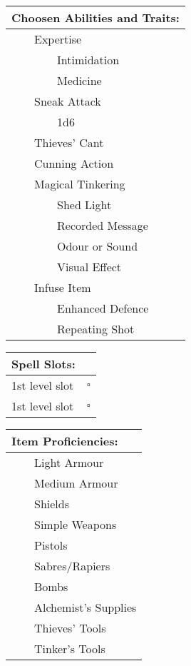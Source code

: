 \documentclass[11pt]{article}
\newcommand{\available}{$\square$}
\newcommand{\tabitem}{~~\llap{--}~~}
\newcommand{\tabtabitem}{~~~~~~\llap{$\bullet$}~~}
\begin{document}
\begin{multicols}{2}
\vspace{4mm}

\noindent \begin{tabularx}{95mm}{@{}l}
{\Large \textbf{Choosen Abilities and Traits:}} \\
\hline
\tabitem Expertise \\
\tabtabitem Intimidation \\
\tabtabitem Medicine \\
\tabitem Sneak Attack \\
\tabtabitem 1d6 \\
\tabitem Thieves' Cant \\
\tabitem Cunning Action \\
\tabitem Magical Tinkering \\
\tabtabitem Shed Light \\
\tabtabitem Recorded Message \\
\tabtabitem Odour or Sound \\
\tabtabitem Visual Effect \\
\tabitem Infuse Item \\
\tabtabitem Enhanced Defence \\
\tabtabitem Repeating Shot
		\end{tabularx}

\vspace{4mm}

\noindent \begin{tabularx}{95mm}{@{}l c}
{\Large \textbf{Spell Slots:}} \\
\hline
1st level slot & \available \\
1st level slot & \available
		\end{tabularx}

\vspace{4mm}

\noindent \begin{tabularx}{95mm}{@{}l}
{\Large \textbf{Item Proficiencies:}} \\
\hline
\tabitem Light Armour \\
\tabitem Medium Armour \\
\tabitem Shields \\
\tabitem Simple Weapons \\
\tabitem Pistols \\
\tabitem Sabres/Rapiers \\
\tabitem Bombs \\
\tabitem Alchemist's Supplies \\
\tabitem Thieves' Tools \\
\tabitem Tinker's Tools \\
		\end{tabularx}
	\end{multicols}
\end{document}
